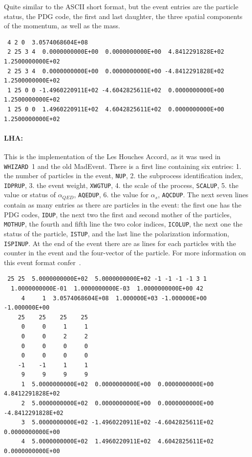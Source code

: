 \documentclass[12pt]{book}
\newcommand{\ttt}[1]{\texttt{#1}}
\newcommand{\whizard}{\ttt{WHIZARD}}
\begin{document}
Quite similar to the ASCII short format, but the event entries are the
particle status, the PDG code, the first and last daughter, the
three spatial components of the momentum, as well as the mass.

\begin{scriptsize}
\begin{verbatim}
 4 2 0  3.0574068604E+08
 2 25 3 4  0.0000000000E+00  0.0000000000E+00  4.8412291828E+02  1.2500000000E+02
 2 25 3 4  0.0000000000E+00  0.0000000000E+00 -4.8412291828E+02  1.2500000000E+02
 1 25 0 0 -1.4960220911E+02 -4.6042825611E+02  0.0000000000E+00  1.2500000000E+02
 1 25 0 0  1.4960220911E+02  4.6042825611E+02  0.0000000000E+00  1.2500000000E+02
\end{verbatim}
\end{scriptsize}

\paragraph{LHA:}

This is the implementation of the Les Houches Accord, as it was used
in \whizard\ 1 and the old MadEvent. There is a first line containing
six entries: 1. the number of particles in the event, \ttt{NUP},
2. the subprocess identification index, \ttt{IDPRUP}, 3. the event
weight, \ttt{XWGTUP}, 4. the scale of the process, \ttt{SCALUP},
5. the value or status of $\alpha_{QED}$, \ttt{AQEDUP}, 6. the value
for $\alpha_s$, \ttt{AQCDUP}. The next seven lines contain as many
entries as there are particles in the event: the first one has the PDG
codes, \ttt{IDUP}, the next two the first and second mother of the particles,
\ttt{MOTHUP}, the fourth and fifth line the two color indices,
\ttt{ICOLUP}, the next one the status of the particle, \ttt{ISTUP},
and the last line the polarization information, \ttt{ISPINUP}.
At the end of the event there are as lines for each particles with the
counter in the event and the four-vector of the particle. For more
information on this event format confer~\cite{LesHouches}.

\begin{scriptsize}
  \begin{verbatim}
 25 25  5.0000000000E+02  5.0000000000E+02 -1 -1 -1 -1 3 1
  1.0000000000E-01  1.0000000000E-03  1.0000000000E+00 42
     4     1  3.0574068604E+08  1.000000E+03 -1.000000E+00 -1.000000E+00
    25    25    25    25
     0     0     1     1
     0     0     2     2
     0     0     0     0
     0     0     0     0
    -1    -1     1     1
     9     9     9     9
     1  5.0000000000E+02  0.0000000000E+00  0.0000000000E+00  4.8412291828E+02
     2  5.0000000000E+02  0.0000000000E+00  0.0000000000E+00 -4.8412291828E+02
     3  5.0000000000E+02 -1.4960220911E+02 -4.6042825611E+02  0.0000000000E+00
     4  5.0000000000E+02  1.4960220911E+02  4.6042825611E+02  0.0000000000E+00
  \end{verbatim}
\end{scriptsize}
\end{document}
